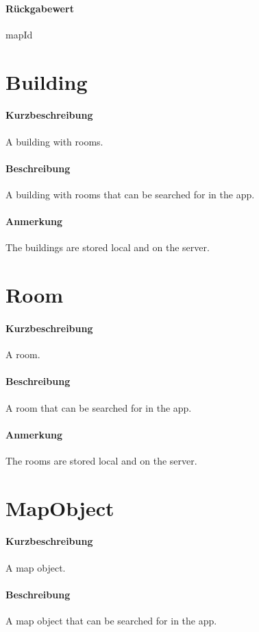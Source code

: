 \paragraph*{Rückgabewert}
mapId

\section{Building}
\paragraph*{Kurzbeschreibung}
A building with rooms.
\paragraph*{Beschreibung}
A building with rooms that can be searched for in the app.
\paragraph*{Anmerkung}
The buildings are stored local and on the server.


\section{Room}
\paragraph*{Kurzbeschreibung}
A room.
\paragraph*{Beschreibung}
A room that can be searched for in the app.
\paragraph*{Anmerkung}
The rooms are stored local and on the server.


\section{MapObject}
\paragraph*{Kurzbeschreibung}
A map object.
\paragraph*{Beschreibung}
A map object that can be searched for in the app.
